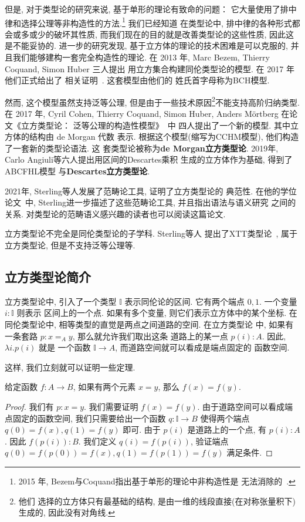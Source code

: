 但是, 对于类型论的研究来说, 基于单形的理论有致命的问题：
它大量使用了排中律和选择公理等非构造性的方法.\footnote{2015
年, Bezem与Coquand指出基于单形的理论中非构造性是
无法消除的~\cite{bezem:2015:simplicial}.} 我们已经知道
在类型论中, 排中律的各种形式都会或多或少的破坏其性质,
而我们现在的目的就是改善类型论的这些性质, 因此这是不能妥协的.
进一步的研究发现, 基于立方体的理论的技术困难是可以克服的,
并且我们能够建构一套完全构造性的理论. 在 2013 年,
Marc Bezem, Thierry Coquand, Simon Huber 三人提出
用立方集合构建同伦类型论的模型. 在 2017 年他们正式给出了
相关证明~\cite{bch:2017:cubical}. 这套模型由他们的
姓氏首字母称为BCH模型.

然而, 这个模型虽然支持泛等公理, 但是由于一些技术原因\footnote{他们
选择的立方体只有最基础的结构, 是由一维的线段直接(在对称张量积下)生成的,
因此没有对角线.}不能支持高阶归纳类型. 在 2017 年,
Cyril Cohen, Thierry Coquand, Simon Huber, Anders M\"ortberg
在论文《立方类型论： 泛等公理的构造性模型》~\cite{abcfhl:2021:cubical}中
四人提出了一个新的模型. 其中立方体的结构由 de Morgan 代数
表示. 根据这个模型(缩写为CCHM模型), 他们构造了一套新的类型论语法. 这
套类型论被称为\textbf{de Morgan立方类型论}.
2019年, Carlo Angiuli等六人提出用区间的Descartes乘积
生成的立方体作为基础, 得到了ABCFHL模型
与\textbf{Descartes立方类型论}.

2021年, Sterling等人发展了范畴论工具, 证明了立方类型论的
典范性. 在他的学位论文~\cite{sterling:2021:thesis}中,
Sterling进一步描述了这些范畴论工具, 并且指出语法与语义研究
之间的关系. 对类型论的范畴语义感兴趣的读者也可以阅读这篇论文.

立方类型论不完全是同伦类型论的子学科. Sterling等人
提出了XTT类型论~\cite{sterling:2019:xtt}, 属于立方类型论,
但是不支持泛等公理等.

\subsection{立方类型论简介}

立方类型论中, 引入了一个类型 \(\mathbb I\) 表示同伦论的区间.
它有两个端点 \(0,1\). 一个变量 \(i : \mathbb I\) 则表示
区间上的一个点. 如果有多个变量, 则它们表示立方体中的某个坐标.
在同伦类型论中, 相等类型的直觉是两点之间道路的空间. 在立方类型论
中, 如果有一条套路 \(p : x =_A y\), 那么就允许我们取出这条
道路上的某一点 \(p(i) : A\). 因此, \(\lambda i. p(i)\) 就是
一个函数 \(\mathbb I \to A\), 而道路空间就可以看成是端点固定的
函数空间.

这样, 我们立刻就可以证明一些定理.

\begin{theorem}
给定函数 \(f : A \to B\), 如果有两个元素 \(x = y\), 那么
\(f(x) = f(y)\).
\end{theorem}
\begin{proof}
我们有 \(p : x = y\). 我们需要证明 \(f(x) = f(y)\).
由于道路空间可以看成端点固定的函数空间, 我们只需要给出一个函数
\(q : \mathbb I \to B\) 使得两个端点 \(q(0) = f(x),
q(1) = f(y)\) 即可. 由于 \(p(i)\) 是道路上的一个点, 有
\(p(i) : A\). 因此 \(f(p(i)) : B\). 我们定义 \(q(i) = f(p(i))\),
验证端点 \(q(0) = f(p(0)) = f(x), q(1) = f(p(1)) = f(y)\)
满足条件.
\end{proof}

